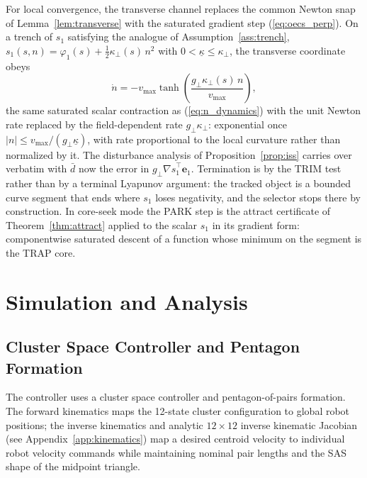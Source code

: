\documentclass[lettersize,journal]{IEEEtran}
\begin{document}
For local convergence, the transverse channel replaces the common
Newton snap of Lemma~\ref{lem:transverse} with the saturated gradient
step (\ref{eq:oecs_perp}). On a trench of $s_1$ satisfying the analogue
of Assumption~\ref{ass:trench}, $s_1(s, n) = \varphi_1(s) +
\tfrac{1}{2}\kappa_\perp(s)\,n^2$ with $0 < \underline{\kappa} \leq
\kappa_\perp$, the transverse coordinate obeys
\begin{equation}
    \dot{n} = -v_{\max}\tanh\!\left(
    \frac{g_\perp \kappa_\perp(s)\,n}{v_{\max}}\right),
    \label{eq:oecs_n_dynamics}
\end{equation}
the same saturated scalar contraction as (\ref{eq:n_dynamics}) with the
unit Newton rate replaced by the field-dependent rate $g_\perp
\kappa_\perp$: exponential once $|n| \leq v_{\max}/(g_\perp
\underline{\kappa})$, with rate proportional to the local curvature
rather than normalized by it. The disturbance analysis of
Proposition~\ref{prop:iss} carries over verbatim with $\bar{d}$ now the
error in $g_\perp \nabla\hat{s}_1^\top\mathbf{e}_1$. Termination is by
the TRIM test rather than by a terminal Lyapunov argument: the tracked
object is a bounded curve segment that ends where $s_1$ loses
negativity, and the selector stops there by construction. In core-seek
mode the PARK step is the attract certificate of
Theorem~\ref{thm:attract} applied to the scalar $s_1$ in its gradient
form: componentwise saturated descent of a function whose minimum on
the segment is the TRAP core.


\section{Simulation and Analysis}
\label{sec:methods}

\subsection{Cluster Space Controller and Pentagon Formation}

The controller uses a cluster space controller and pentagon-of-pairs
formation. The forward kinematics maps the 12-state
cluster configuration to global robot positions; the inverse kinematics
and analytic $12 \times 12$ inverse kinematic Jacobian (see
Appendix~\ref{app:kinematics}) map a desired centroid velocity to
individual robot velocity commands while maintaining nominal pair lengths
and the SAS shape of the midpoint triangle.
\end{document}
